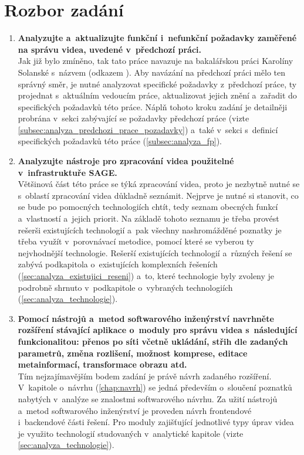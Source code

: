 \documentclass[thesis=M,czech]{FITthesis}[2012/06/26]
\begin{document}
\section{Rozbor zadání} \label{sec:analyza_rozbor_zadani}
\begin{enumerate}
	\item \textbf{Analyzujte a~aktualizujte funkční i~nefunkční požadavky zaměřené na správu videa, uvedené v~předchozí
práci.\\}
	Jak již bylo zmíněno, tak tato práce navazuje na bakalářskou práci Karolíny Solanské s~názvem  (odkazem \cite{solankar}). Aby navázání na předchozí práci mělo ten správný směr, je nutné analyzovat specifické požadavky z~předchozí práce, ty projednat s~aktuálním vedoucím práce, aktualizovat jejich znění a~zařadit do specifických požadavků této práce. Náplň tohoto kroku zadání je detailněji probrána v~sekci zabývající se požadavky předchozí práce (vizte \ref{subsec:analyza_predchozi_prace_pozadavky}) a~také v~sekci s~definicí specifických požadavků této práce (\ref{subsec:analyza_fp}).
	\item \textbf{Analyzujte nástroje pro zpracování videa použitelné v~infrastruktuře SAGE.\\}
	Většinová část této práce se týká zpracování videa, proto je nezbytně nutné se s~oblastí zpracování videa důkladně seznámit. 
	Nejprve je nutné si stanovit, co se bude po pomocných technologiích chtít, tedy seznam obecných funkcí a~vlastností a~jejich priorit. Na základě tohoto seznamu je třeba provést rešerši existujících technologií a~pak všechny nashromážděné poznatky je třeba využít v~porovnávací metodice, pomocí které se vyberou ty nejvhodnější technologie. Rešerší existujících technologií a~různých řešení se zabývá podkapitola o~existujících komplexních řešeních (\ref{sec:analyza_existujici_reseni}) a~to, které technologie byly zvoleny je podrobně shrnuto v~podkapitole o~vybraných technologiích (\ref{sec:analyza_technologie}).
	\item \textbf{Pomocí nástrojů a~metod softwarového inženýrství navrhněte rozšíření stávající aplikace o~moduly pro
správu videa s~následující funkcionalitou: přenos po síti včetně ukládání, střih dle zadaných parametrů,
změna rozlišení, možnost komprese, editace metainformací, transformace obrazu atd.\\}
	Tím nejzajímavějším bodem zadání je právě návrh zadaného rozšíření. V~kapitole o~návrhu (\ref{chap:navrh}) se jedná především o~sloučení poznatků nabytých v~analýze se znalostmi softwarového návrhu. Za užití nástrojů a~metod softwarového inženýrství je proveden návrh frontendové i~backendové části řešení. Pro moduly zajišťující jednotlivé typy úprav videa je využito technologií studovaných v~analytické kapitole (vizte \ref{sec:analyza_technologie}).  

\end{enumerate}
\end{document}
